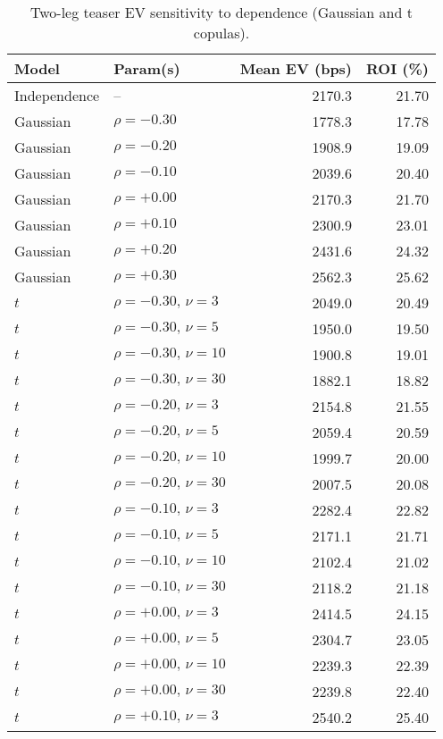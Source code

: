 \begin{table}[t]
  \centering
  \small
  \caption{Two-leg teaser EV sensitivity to dependence (Gaussian and t copulas).}
  \label{tab:teaser-sensitivity}
  \begin{tabular}{l l r r}
    \toprule
    Model & Param(s) & Mean EV (bps) & ROI (\%) \\
    \midrule
    Independence & -- & 2170.3 & 21.70 \\
    \midrule
    Gaussian & $\rho=-0.30$ & 1778.3 & 17.78 \\
    Gaussian & $\rho=-0.20$ & 1908.9 & 19.09 \\
    Gaussian & $\rho=-0.10$ & 2039.6 & 20.40 \\
    Gaussian & $\rho=+0.00$ & 2170.3 & 21.70 \\
    Gaussian & $\rho=+0.10$ & 2300.9 & 23.01 \\
    Gaussian & $\rho=+0.20$ & 2431.6 & 24.32 \\
    Gaussian & $\rho=+0.30$ & 2562.3 & 25.62 \\
    \midrule
    $t$ & $\rho=-0.30,\,\nu=3$ & 2049.0 & 20.49 \\
    $t$ & $\rho=-0.30,\,\nu=5$ & 1950.0 & 19.50 \\
    $t$ & $\rho=-0.30,\,\nu=10$ & 1900.8 & 19.01 \\
    $t$ & $\rho=-0.30,\,\nu=30$ & 1882.1 & 18.82 \\
    $t$ & $\rho=-0.20,\,\nu=3$ & 2154.8 & 21.55 \\
    $t$ & $\rho=-0.20,\,\nu=5$ & 2059.4 & 20.59 \\
    $t$ & $\rho=-0.20,\,\nu=10$ & 1999.7 & 20.00 \\
    $t$ & $\rho=-0.20,\,\nu=30$ & 2007.5 & 20.08 \\
    $t$ & $\rho=-0.10,\,\nu=3$ & 2282.4 & 22.82 \\
    $t$ & $\rho=-0.10,\,\nu=5$ & 2171.1 & 21.71 \\
    $t$ & $\rho=-0.10,\,\nu=10$ & 2102.4 & 21.02 \\
    $t$ & $\rho=-0.10,\,\nu=30$ & 2118.2 & 21.18 \\
    $t$ & $\rho=+0.00,\,\nu=3$ & 2414.5 & 24.15 \\
    $t$ & $\rho=+0.00,\,\nu=5$ & 2304.7 & 23.05 \\
    $t$ & $\rho=+0.00,\,\nu=10$ & 2239.3 & 22.39 \\
    $t$ & $\rho=+0.00,\,\nu=30$ & 2239.8 & 22.40 \\
    $t$ & $\rho=+0.10,\,\nu=3$ & 2540.2 & 25.40 \\

\end{tabular}
\end{table}
